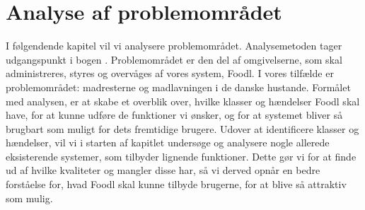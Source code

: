 \chapter{Analyse af problemområdet}
\label{chap:analyseafpo}

I følgendende kapitel vil vi analysere problemområdet. Analysemetoden tager udgangspunkt i bogen \cite[s. ~43]{ooad}. Problemområdet er den del af omgivelserne, som skal administreres, styres og overvåges af vores system, Foodl. I vores tilfælde er problemområdet: madresterne og madlavningen i de danske hustande. Formålet med analysen, er at skabe et overblik over, hvilke klasser og hændelser Foodl skal have, for at kunne udføre de funktioner vi ønsker, og for at systemet bliver så brugbart som muligt for dets fremtidige brugere. Udover at identificere klasser og hændelser, vil vi i starten af kapitlet undersøge og analysere nogle allerede eksisterende systemer, som tilbyder lignende funktioner. Dette gør vi for at finde ud af hvilke kvaliteter og mangler disse har, så vi derved opnår en bedre forståelse for, hvad Foodl skal kunne tilbyde brugerne, for at blive så attraktiv som mulig.



 

